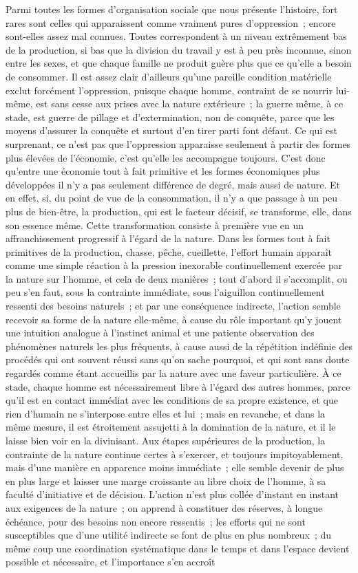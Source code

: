 \documentclass[french,twoside]{book} %
\begin{document}
Parmi toutes les formes d'organisation sociale que nous présente l'histoire, fort rares sont celles qui apparaissent comme vraiment pures d'oppression ; encore sont-elles assez mal connues. Toutes correspondent à un niveau extrêmement bas de la production, si bas que la division du travail y est à peu près inconnue, sinon entre les sexes, et que chaque famille ne produit guère plus que ce qu'elle a besoin de consommer. Il est assez clair d'ailleurs qu'une pareille condition matérielle exclut forcément l'oppression, puisque chaque homme, contraint de se nourrir lui-même, est sans cesse aux prises avec la nature extérieure ; la guerre même, à ce stade, est guerre de pillage et d'extermination, non de conquête, parce que les moyens d'assurer la conquête et surtout d'en tirer parti font défaut. Ce qui est surprenant, ce n'est pas que l'oppression apparaisse seulement à partir des formes plus élevées de l'économie, c'est qu'elle les accompagne toujours. C'est donc qu'entre une économie tout à fait primitive et les formes économiques plus développées il n'y a pas seulement différence de degré, mais aussi de nature. Et en effet, si, du point de vue de la consommation, il n'y a que passage à un peu plus de bien-être, la production, qui est le facteur décisif, se transforme, elle, dans son essence même. Cette transformation consiste à première vue en un affranchissement progressif à l'égard de la nature. Dans les formes tout à fait primitives de la production, chasse, pêche, cueillette, l'effort humain apparaît comme une simple réaction à la pression inexorable continuellement exercée par la nature sur l'homme, et cela de deux manières ; tout d'abord il s'accomplit, ou peu s'en faut, sous la contrainte immédiate, sous l'aiguillon continuellement ressenti des besoins naturels ; et par une conséquence indirecte, l'action semble recevoir sa forme de la nature elle-même, à cause du rôle important qu'y jouent une intuition analogue à l'instinct animal et une patiente observation des phénomènes naturels les plus fréquents, à cause aussi de la répétition indéfinie des procédés qui ont souvent réussi sans qu'on sache pourquoi, et qui sont sans doute regardés comme étant accueillis par la nature avec une faveur particulière. À ce stade, chaque homme est nécessairement libre à l'égard des autres hommes, parce qu'il est en contact immédiat avec les conditions de sa propre existence, et que rien d'humain ne s'interpose entre elles et lui ; mais en revanche, et dans la même mesure, il est étroitement assujetti à la domination de la nature, et il le laisse bien voir en la divinisant. Aux étapes supérieures de la production, la contrainte de la nature continue certes à s'exercer, et toujours impitoyablement, mais d'une manière en apparence moins immédiate ; elle semble devenir de plus en plus large et laisser une marge croissante au libre choix de l’homme, à sa faculté d'initiative et de décision. L'action n'est plus collée d'instant en instant aux exigences de la nature ; on apprend à constituer des réserves, à longue échéance, pour des besoins non encore ressentis ; les efforts qui ne sont susceptibles que d'une utilité indirecte se font de plus en plus nombreux ; du même coup une coordination systématique dans le temps et dans l'espace devient possible et nécessaire, et l'importance s'en accroît 
\end{document}
